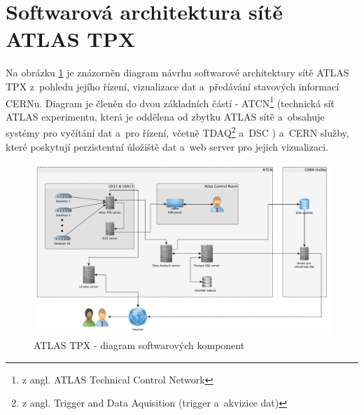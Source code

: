 \section{Softwarová architektura sítě ATLAS TPX}\label{atlas:sw_arch}
Na obrázku \ref{fig:tpx_sw_diagram} je znázorněn diagram návrhu softwarové architektury sítě ATLAS TPX z~pohledu jejího řízení, vizualizace dat a~předávání stavových informací CERNu. Diagram je členěn do dvou základních částí - ATCN\footnote{z angl. ATLAS Technical Control Network} (technická síť ATLAS experimentu, která je oddělena od zbytku ATLAS sítě a~obsahuje systémy pro vyčítání dat a~pro řízení, včetně TDAQ\footnote{z angl. Trigger and Data Aquisition (trigger a~akvizice dat)} a~DSC \cite{Ballestrero:atlas_network_upgrade}) a~CERN služby, které poskytují perzistentní úložiště dat a~web server pro jejich vizualizaci.

\begin{figure}[th]
	\begin{center}
		\includegraphics[width=16cm]{figures/atlas_tpx_sw_diagram.pdf}
		\caption{ATLAS TPX - diagram softwarových komponent}
		\label{fig:tpx_sw_diagram}
	\end{center}
\end{figure}

